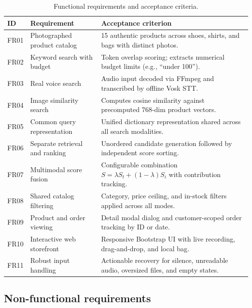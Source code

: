 \documentclass[12pt,a4paper]{article}
\begin{document}
\begin{table}[H]\centering\small
\caption{Functional requirements and acceptance criteria.}\label{tab:fr}
\begin{tabularx}{\textwidth}{@{}lLL@{}}\toprule
\textbf{ID} & \textbf{Requirement} & \textbf{Acceptance criterion} \\\midrule
FR01 & Photographed product catalog & 15 authentic products across shoes, shirts, and bags with distinct photos. \\
FR02 & Keyword search with budget & Token overlap scoring; extracts numerical budget limits (e.g., ``under 100''). \\
FR03 & Real voice search & Audio input decoded via FFmpeg and transcribed by offline Vosk STT. \\
FR04 & Image similarity search & Computes cosine similarity against precomputed 768-dim product vectors. \\
FR05 & Common query representation & Unified dictionary representation shared across all search modalities. \\
FR06 & Separate retrieval and ranking & Unordered candidate generation followed by independent score sorting. \\
FR07 & Multimodal score fusion & Configurable combination $S = \lambda S_t + (1-\lambda) S_i$ with contribution tracking. \\
FR08 & Shared catalog filtering & Category, price ceiling, and in-stock filters applied across all modes. \\
FR09 & Product and order viewing & Detail modal dialog and customer-scoped order tracking by ID or date. \\
FR10 & Interactive web storefront & Responsive Bootstrap UI with live recording, drag-and-drop, and local bag. \\
FR11 & Robust input handling & Actionable recovery for silence, unreadable audio, oversized files, and empty states. \\
\bottomrule\end{tabularx}\end{table}

\subsection{Non-functional requirements}
\end{document}
